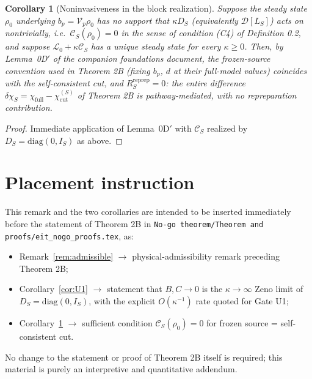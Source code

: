 \documentclass[11pt]{article}
\newtheorem{corollary}[theorem]{Corollary}
\begin{document}
\begin{corollary}[Noninvasiveness in the block realization]
\label{cor:0Dblock}
Suppose the steady state $\rho_0$ underlying $b_p=\mathcal V_p\rho_0$ has
no support that $\kappa D_S$ (equivalently $\mathcal D[L_S]$) acts on
nontrivially, i.e.\ $\mathcal C_S(\rho_0)=0$ in the sense of condition
(C4) of Definition 0.2, and suppose $\mathcal L_0+\kappa\mathcal C_S$ has
a unique steady state for every $\kappa\ge0$. Then, by Lemma~0D$'$ of the
companion foundations document, the frozen-source convention used in
Theorem 2B (fixing $b_p$, $d$ at their full-model values) coincides with
the self-consistent cut, and $R_S^{\mathrm{reprep}}=0$: the entire
difference $\delta\chi_S=\chi_{\mathrm{full}}-\chi_{\mathrm{cut}}^{(S)}$
of Theorem 2B is pathway-mediated, with no repreparation contribution.
\end{corollary}

\begin{proof}
Immediate application of Lemma~0D$'$ with $\mathcal C_S$ realized by
$D_S=\mathrm{diag}(0,I_S)$ as above.
\end{proof}

\section*{Placement instruction}

\noindent This remark and the two corollaries are intended to be inserted
immediately before the statement of Theorem 2B in
\texttt{No-go theorem/Theorem and proofs/eit\_nogo\_proofs.tex}, as:
\begin{itemize}[nosep]
\item Remark~\ref{rem:admissible} $\to$ physical-admissibility remark
      preceding Theorem 2B;
\item Corollary~\ref{cor:U1} $\to$ statement that $B,C\to0$ is the
      $\kappa\to\infty$ Zeno limit of $D_S=\mathrm{diag}(0,I_S)$, with
      the explicit $O(\kappa^{-1})$ rate quoted for Gate U1;
\item Corollary~\ref{cor:0Dblock} $\to$ sufficient condition
      $\mathcal C_S(\rho_0)=0$ for frozen source = self-consistent cut.
\end{itemize}
No change to the statement or proof of Theorem 2B itself is required;
this material is purely an interpretive and quantitative addendum.
\end{document}
